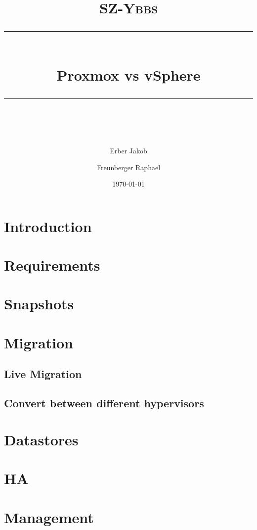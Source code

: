 \documentclass[11pt]{scrartcl} %
\title{	
	\normalfont\normalsize
	\textsc{SZ-Ybbs}\\ %
	\vspace{25pt} %
	\rule{\linewidth}{0.5pt}\\ %
	\vspace{20pt} %
	{\huge Proxmox vs vSphere}\\ %
	\vspace{12pt} %
	\rule{\linewidth}{2pt}\\ %
	\vspace{12pt} %
}
\author{\LARGE Erber Jakob \and \LARGE Freunberger Raphael} %
\date{\normalsize\today} %
\begin{document}
\maketitle %

\section{Introduction}

\section{Requirements}

\section{Snapshots}

\section{Migration}

\subsection{Live Migration}
\subsection{Convert between different hypervisors}

\section{Datastores}

\section{HA}

\section{Management}


\end{document}
